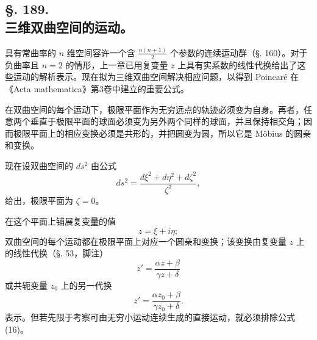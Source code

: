 \subsection*{§. 189.\\ 三维双曲空间的运动。}

具有常曲率的 $n$ 维空间容许一个含 $\frac{n(n+1)}2$ 个参数的连续运动群（§. 160）。对于负曲率且 $n=2$ 的情形，上一章已用复变量 $z$ 上具有实系数的线性代换给出了这些运动的解析表示。现在拟为三维双曲空间解决相应问题，以得到 Poincaré 在《Acta mathematica》第3卷中建立的重要公式。

在双曲空间的每个运动下，极限平面作为无穷远点的轨迹必须变为自身。再者，任意两个垂直于极限平面的球面必须变为另外两个同样的球面，并且保持相交角；因而极限平面上的相应变换必须是共形的，并把圆变为圆，所以它是 Möbius 的圆亲和变换。

现在设双曲空间的 $ds^2$ 由公式
\[
\tag{14}
 ds^2=\frac{d\xi^2+d\eta^2+d\zeta^2}{\zeta^2},
\]
给出，极限平面为 $\zeta=0$。

在这个平面上铺展复变量的值
\[
 z=\xi+i\eta;
\]
双曲空间的每个运动都在极限平面上对应一个圆亲和变换；该变换由复变量 $z$ 上的线性代换（§. 53，脚注）
\[
\tag{15}
 z'=\frac{\alpha z+\beta}{\gamma z+\delta}
\]
或共轭变量 $z_0$ 上的另一代换
\[
\tag{16}
 z'=\frac{\alpha z_0+\beta}{\gamma z_0+\delta}.
\]
表示。但若先限于考察可由无穷小运动连续生成的直接运动，就必须排除公式 (16)。

